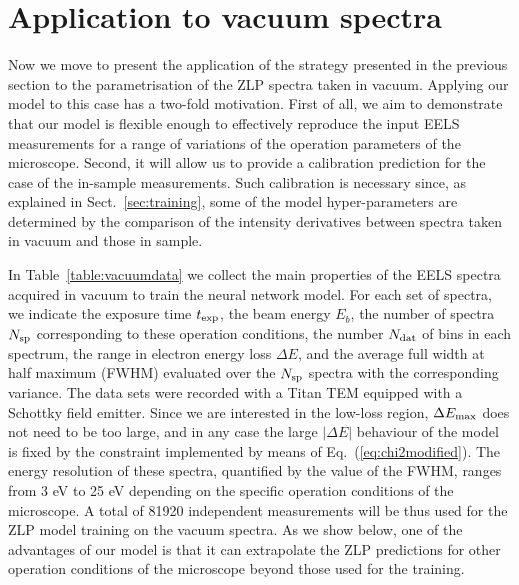 \section{Application to vacuum spectra}
\label{sec:results_vacuum}

Now we move to present the application of the strategy presented in the previous
section to the parametrisation of the ZLP spectra taken in vacuum.
%
Applying our model to this case has a two-fold motivation.
%
First of all, we aim to demonstrate that our model is flexible enough to effectively reproduce the
input EELS measurements for a range of variations of the operation parameters of the microscope.
%
Second, it will allow us to provide a calibration prediction for the case of the in-sample measurements.
%
Such calibration is necessary since, as explained in Sect.~\ref{sec:training}, some of the model
hyper-parameters are determined by the comparison of the intensity derivatives
between spectra taken in vacuum and those in sample.

In Table~\ref{table:vacuumdata} we collect the main properties of the EELS spectra acquired in vacuum to train the neural
    network model.  For each set of spectra, we indicate the exposure time $t_{\rm exp}$, the beam energy
    $E_b$, the number of spectra $N_{\rm sp}$ corresponding to these operation conditions, the number $N_{\rm dat}$ of
    bins in each spectrum, the range in electron energy loss $\Delta E$,
    and the average full width at half maximum (FWHM)
    evaluated over the $N_{\rm sp}$ spectra with the corresponding variance.
    The data sets were recorded with a Titan TEM equipped with a Schottky field emitter.
    Since we are interested in the low-loss region, $\Delta E_{\rm max}$ does not need
    to be too large, and in any case the large $|\Delta E|$ behaviour of the model is fixed
    by the constraint implemented by means of Eq.~(\ref{eq:chi2modified}).
    The energy resolution of these spectra, quantified by the value of the FWHM, ranges
    from 3 eV to 25 eV depending on the specific operation conditions of the microscope.
    A total of 81920 independent measurements will be thus used for the ZLP model
    training on the vacuum spectra.
    As we show below, one of the advantages of our model is that it can extrapolate the ZLP predictions
    for other operation conditions of the microscope beyond those used for the training.

